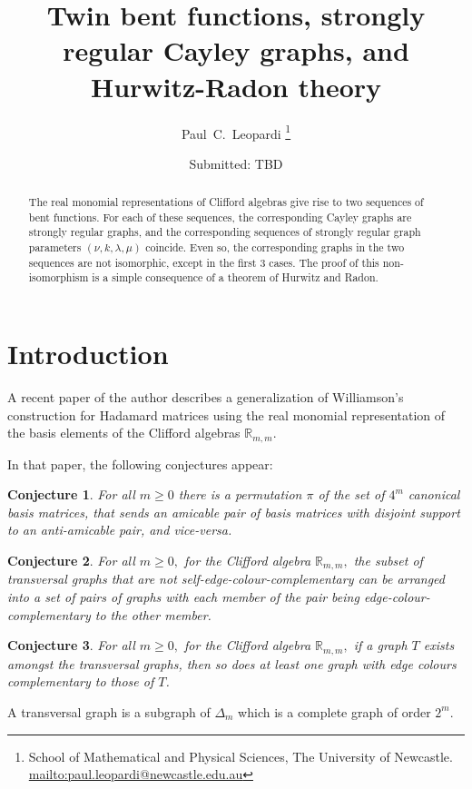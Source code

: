 \documentclass[12pt,a4paper]{article}
\title{Twin bent functions, strongly regular Cayley graphs, and Hurwitz-Radon theory}
\author{
Paul~C.~Leopardi
\thanks{School of Mathematical and Physical Sciences, The University of Newcastle.
\protect\url{mailto:paul.leopardi@newcastle.edu.au}}
}
\date{Submitted: TBD}
\newcommand{\mb}[1]{\mathbb{#1}}
\newcommand{\R}{\mb{R}}
\newtheorem{Conjecture}{Conjecture}
\begin{document}
\maketitle

\begin{abstract}
%
The real monomial representations of Clifford algebras
give rise to two sequences of bent functions.
For each of these sequences, the corresponding Cayley graphs are 
strongly regular graphs, and the corresponding sequences of strongly regular graph parameters
$(\nu,k,\lambda,\mu)$ coincide.
Even so, the corresponding graphs in the two sequences are not isomorphic, except in the first 3 cases.
The proof of this non-isomorphism is a simple consequence of a theorem of Hurwitz and Radon.  
%
\end{abstract}

\section{Introduction}
\label{sec-intro}

A recent paper of the author \cite{Leo14Constructions} describes a generalization of
Williamson's construction for Hada\-mard matrices \cite{Wil44}
using the real monomial representation of the basis elements of the Clifford algebras $\R_{m,m}$.

In that paper, the following conjectures appear:

\begin{Conjecture}\label{conjecture-1}
%
For all $m \geqslant 0$ there is a permutation $\pi$ of the set of $4^m$ canonical basis matrices,
that sends an amicable pair of basis matrices with disjoint support to an anti-amicable pair, and vice-versa.
%
\end{Conjecture}

\begin{Conjecture}\label{conjecture-2}
%
For all $m \geqslant 0,$ 
for the Clifford algebra $\R_{m,m},$ the subset of transversal graphs that are 
not self-edge-colour-complementary
can be arranged into a set of pairs of graphs with each member of the pair 
being edge-colour-complementary to the other member.
%
\end{Conjecture}

\begin{Conjecture}\label{conjecture-3}
%
For all $m \geqslant 0,$ 
for the Clifford algebra $\R_{m,m},$ if a graph $T$ exists amongst the transversal graphs,
then so does at least one graph with edge colours complementary to those of $T$.
%
\end{Conjecture}
A transversal graph is a subgraph of $\varDelta_m$ which is a complete graph of order $2^m$.
\end{document}
